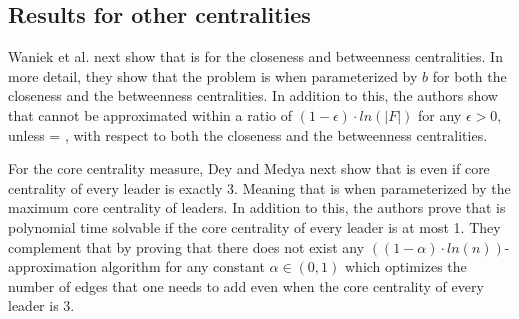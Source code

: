 \subsection{Results for other centralities}

Waniek et al. next show that \HL is \NPc for the closeness \cite{Waniek2017} and betweenness \cite{Waniek2021full} centralities.
In more detail, they show that the problem is \Wh when parameterized by $b$ for both the closeness and the betweenness centralities.
In addition to this, the authors show that \HL cannot be approximated within a ratio of $(1 - \epsilon ) \cdot ln(|F|)$
for any $\epsilon > 0$, unless \Po = \NP, with respect to both the closeness and the betweenness centralities. 

For the core centrality measure, Dey and Medya \cite{Dey2019} next show that \HLshort is \NPc even if core centrality of
every leader is exactly 3. Meaning that \HLshort is \pNPh when parameterized by the maximum core centrality of leaders.
In addition to this, the authors prove that \HLshort is polynomial time solvable
if the core centrality of every leader is at most 1.
They complement that by proving that there does not exist any $((1 - \alpha) \cdot ln(n))$-approximation algorithm
for any constant $\alpha \in (0, 1)$ which optimizes the number of edges that one needs to add even
when the core centrality of every leader is 3.
 